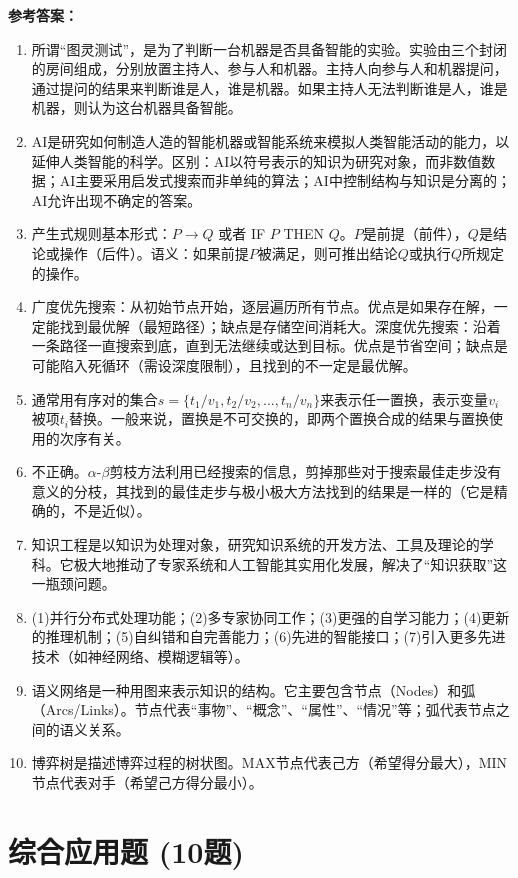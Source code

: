 \textbf{参考答案：}
\begin{enumerate}[label=\arabic*.]
\item 所谓“图灵测试”，是为了判断一台机器是否具备智能的实验。实验由三个封闭的房间组成，分别放置主持人、参与人和机器。主持人向参与人和机器提问，通过提问的结果来判断谁是人，谁是机器。如果主持人无法判断谁是人，谁是机器，则认为这台机器具备智能。
\item AI是研究如何制造人造的智能机器或智能系统来模拟人类智能活动的能力，以延伸人类智能的科学。区别：AI以符号表示的知识为研究对象，而非数值数据；AI主要采用启发式搜索而非单纯的算法；AI中控制结构与知识是分离的；AI允许出现不确定的答案。
\item 产生式规则基本形式：$P \to Q$ 或者 IF $P$ THEN $Q$。$P$是前提（前件），$Q$是结论或操作（后件）。语义：如果前提$P$被满足，则可推出结论$Q$或执行$Q$所规定的操作。
\item 广度优先搜索：从初始节点开始，逐层遍历所有节点。优点是如果存在解，一定能找到最优解（最短路径）；缺点是存储空间消耗大。深度优先搜索：沿着一条路径一直搜索到底，直到无法继续或达到目标。优点是节省空间；缺点是可能陷入死循环（需设深度限制），且找到的不一定是最优解。
\item 通常用有序对的集合$s=\{t_1/v_1, t_2/v_2, \dots, t_n/v_n\}$来表示任一置换，表示变量$v_i$被项$t_i$替换。一般来说，置换是不可交换的，即两个置换合成的结果与置换使用的次序有关。
\item 不正确。$\alpha$-$\beta$剪枝方法利用已经搜索的信息，剪掉那些对于搜索最佳走步没有意义的分枝，其找到的最佳走步与极小极大方法找到的结果是一样的（它是精确的，不是近似）。
\item 知识工程是以知识为处理对象，研究知识系统的开发方法、工具及理论的学科。它极大地推动了专家系统和人工智能其实用化发展，解决了“知识获取”这一瓶颈问题。
\item (1)并行分布式处理功能；(2)多专家协同工作；(3)更强的自学习能力；(4)更新的推理机制；(5)自纠错和自完善能力；(6)先进的智能接口；(7)引入更多先进技术（如神经网络、模糊逻辑等）。
\item 语义网络是一种用图来表示知识的结构。它主要包含节点（Nodes）和弧（Arcs/Links）。节点代表“事物”、“概念”、“属性”、“情况”等；弧代表节点之间的语义关系。
\item 博弈树是描述博弈过程的树状图。MAX节点代表己方（希望得分最大），MIN节点代表对手（希望己方得分最小）。
\end{enumerate}

\section{综合应用题 (10题)}

